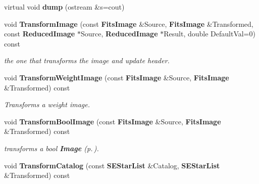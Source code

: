\begin{CompactItemize}
\item 
{}
virtual void {\bf dump} (ostream \&s=cout)\label{class_imagegtransfo_a7}

\item 
{}
void {\bf Transform\-Image} (const {\bf Fits\-Image} \&Source, {\bf Fits\-Image} \&Transformed, const {\bf Reduced\-Image} $\ast$Source, {\bf Reduced\-Image} $\ast$Result, double Default\-Val=0) const\label{class_imagegtransfo_a8}

\begin{CompactList}\small\item\em the one that transforms the image and update header.\item\end{CompactList}\item 
{}
void {\bf Transform\-Weight\-Image} (const {\bf Fits\-Image} \&Source, {\bf Fits\-Image} \&Transformed) const\label{class_imagegtransfo_a9}

\begin{CompactList}\small\item\em Transforms a weight image.\item\end{CompactList}\item 
{}
void {\bf Transform\-Bool\-Image} (const {\bf Fits\-Image} \&Source, {\bf Fits\-Image} \&Transformed) const\label{class_imagegtransfo_a10}

\begin{CompactList}\small\item\em transforms a bool {\bf Image} {\rm (p.\,\pageref{class_image})}.\item\end{CompactList}\item 
{}
void {\bf Transform\-Catalog} (const {\bf SEStar\-List} \&Catalog, {\bf SEStar\-List} \&Transformed) const\label{class_imagegtransfo_a11}


\end{CompactItemize}

